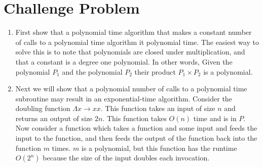 \documentclass[12pt,letterpaper]{article}
\begin{document}
\section*{Challenge Problem}
\begin{enumerate}[label=(\alph*)]
    \item First show that a polynomial time algorithm that makes a constant number of calls to a polynomial time algorithm it polynomial time. The easiest way to solve this is to note that polynomials are closed under multiplication, and that a constant is a degree one polynomial. In other words, Given the polynomial $P_1$ and the polynomial $P_2$ their product $P_1 \times P_2$ is a polynomial.\\
    \item Next we will show that a polynomial number of calls to a polynomial time subroutine may result in an exponential-time algorithm. Consider the doubling function $\Lambda x \rightarrow x x$. This function takes an input of size $n$ and returns an output of size $2n$. This function takes $O(n)$ time and is in $P$. Now consider a function which takes a function and some input and feeds the input to the function, and then feeds the output of the function back into the function $m$ times. $m$ is a polynomial, but this function has the runtime $O(2^n)$ because the size of the input doubles each invocation.
\end{enumerate}
\end{document}
